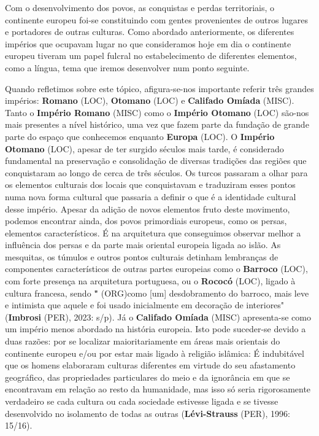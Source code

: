 \documentclass[12pt,a4paper]{article}
\begin{document}
Com  o  desenvolvimento  dos  povos,  as  conquistas  e  perdas  territoriais,  o continente  europeu  foi-se  constituindo  com  gentes  provenientes  de  outros  lugares  e portadores de outras culturas. Como abordado anteriormente, os diferentes impérios que ocupavam lugar no que consideramos hoje em dia o continente europeu tiveram um papel fulcral  no  estabelecimento  de  diferentes  elementos,  como  a  língua,  tema  que  iremos desenvolver num ponto seguinte.

Quando refletimos sobre este tópico, afigura-se-nos importante referir três grandes impérios:  \textbf{Romano} (LOC),  \textbf{Otomano} (LOC)  e  \textbf{Califado  Omíada} (MISC).  Tanto  o  \textbf{Império  Romano} (MISC)  como  o \textbf{Império Otomano} (LOC) são-nos mais presentes a nível histórico, uma vez que fazem parte da fundação  de  grande  parte  do  espaço  que  conhecemos  enquanto  \textbf{Europa} (LOC).  O  \textbf{Império Otomano} (LOC),  apesar  de  ter  surgido  séculos  mais  tarde,  é  considerado  fundamental  na preservação e consolidação de diversas tradições das regiões que conquistaram ao longo de cerca de três séculos. Os turcos passaram a olhar para os elementos culturais dos locais que  conquistavam  e  traduziram  esses  pontos  numa  nova  forma  cultural  que  passaria  a definir o que é a identidade cultural desse império. Apesar da adição de novos elementos fruto deste movimento, podemos encontrar ainda, dos povos primordiais europeus, como os persas, elementos característicos. É na arquitetura que conseguimos observar melhor a influência dos persas e da parte mais oriental europeia ligada ao islão. As mesquitas, os túmulos e outros pontos culturais detinham lembranças de componentes característicos de outras partes europeias como o \textbf{Barroco} (LOC), com forte presença na arquitetura portuguesa, ou o \textbf{Rococó} (LOC), ligado à cultura francesa, sendo \textbf{"} (ORG)como [um] desdobramento do barroco, mais  leve  e  intimista  que  aquele  e  foi  usado  inicialmente  em  decoração  de  interiores" (\textbf{Imbrosi} (PER),  2023:  s/p).  Já  o  \textbf{Califado  Omíada} (MISC)  apresenta-se  como  um  império  menos abordado na história europeia. Isto pode suceder-se devido a duas razões: por se localizar maioritariamente em áreas mais orientais do continente europeu e/ou por estar mais ligado à religião islâmica: É  indubitável  que  os  homens  elaboraram  culturas  diferentes  em  virtude  do  seu afastamento geográfico, das propriedades particulares do meio e da ignorância em que se encontravam  em  relação  ao  resto  da  humanidade,  mas  isso  só  seria  rigorosamente verdadeiro se cada cultura ou cada sociedade estivesse ligada e se tivesse desenvolvido no isolamento de todas as outras (\textbf{Lévi-Strauss} (PER), 1996: 15/16).
\end{document}
